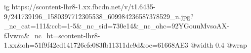  
 
 
 
 

\ifcmt
  ig https://scontent-lhr8-1.xx.fbcdn.net/v/t1.6435-9/241739196_1580397712305538_609984236587378529_n.jpg?_nc_cat=111&ccb=1-5&_nc_sid=730e14&_nc_ohc=92YGouuMvsoAX-fJvwm&_nc_ht=scontent-lhr8-1.xx&oh=51f9f42cd141726cfe083fb11311de9d&oe=61668AE3
  @width 0.4
  @wrap 
\fi
